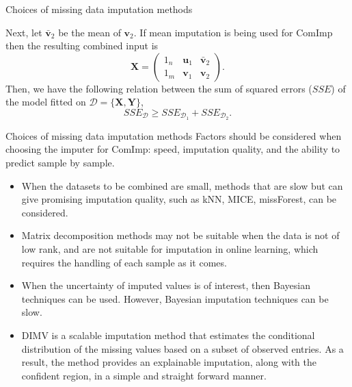 \documentclass[xcolor={dvipsnames}]{beamer} %
\begin{document}
\begin{frame}{Choices of missing data imputation methods}
    \begin{theo}
Next, let $\bar{\mathbf{v}}_2$ be the mean of $\mathbf{v}_2$. If mean imputation is being used for ComImp then the resulting combined input is 
\begin{equation}
\mathbf{X} =  \begin{pmatrix}
    1_n & \mathbf{u}_1 & \bar{\mathbf{v}}_2\\
    1_m & \mathbf{v}_1 & \mathbf{v}_2
\end{pmatrix}.
\end{equation}
 Then, we have the following relation between the sum of squared errors ($SSE$) of the model fitted on $\mathcal{D} = \{\mathbf{X}, \mathbf{Y}\}$, 
\begin{equation}\label{equation-inq}
    SSE_{\mathcal{D}} \ge SSE_{\mathcal{D}_1}+ SSE_{\mathcal{D}_2}.
\end{equation}
\end{theo}
\end{frame}



\begin{frame}{Choices of missing data imputation methods}
Factors should be considered when choosing the imputer for ComImp: speed, imputation quality, and the ability to predict sample by sample.
\begin{itemize}
\item When the datasets to be combined are small, methods that are slow but can give promising imputation quality, such as kNN, MICE, missForest, can be considered. 

\item Matrix decomposition methods may not be suitable when the data is not of low rank, and are not suitable for imputation in online learning, which requires the handling of each sample as it comes. 

\item When the uncertainty of imputed values is of interest, then Bayesian techniques can be used. However, Bayesian imputation techniques can be slow. 

\item DIMV is a scalable imputation method that estimates the conditional distribution of the missing values based on a subset of observed entries. As a result, the method provides an explainable imputation, along with the confident region, in a simple and straight forward manner.

\end{itemize}
\end{frame}
\end{document}
